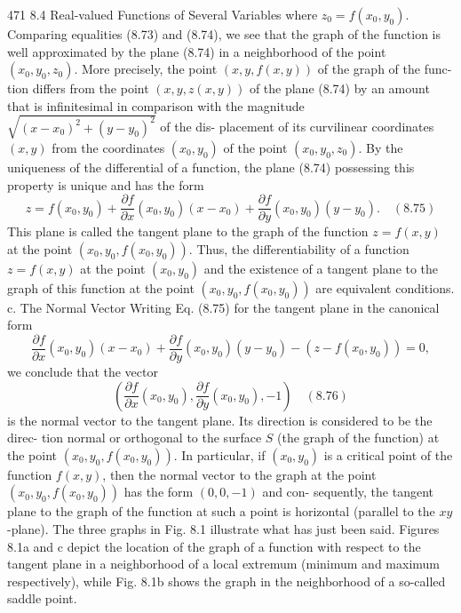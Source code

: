 471
8.4 Real-valued Functions of Several Variables
where $z_0 = f (x_0, y_0)$. Comparing equalities (8.73) and (8.74), we see that the graph
of the function is well approximated by the plane (8.74) in a neighborhood of the
point $(x_0, y_0, z_0)$. More precisely, the point $(x, y, f (x, y))$ of the graph of the func-
tion differs from the point $(x, y, z(x, y))$ of the plane (8.74) by an amount that is
infinitesimal in comparison with the magnitude $\sqrt{(x - x_0)^2 + (y - y_0)^2}$ of the dis-
placement of its curvilinear coordinates $(x, y)$ from the coordinates $(x_0, y_0)$ of the
point $(x_0, y_0, z_0)$.
By the uniqueness of the differential of a function, the plane (8.74) possessing
this property is unique and has the form
$$z = f (x_0, y_0) + \frac{\partial f}{\partial x}(x_0, y_0)(x - x_0) + \frac{\partial f}{\partial y}(x_0, y_0)(y - y_0). \quad (8.75)$$
This plane is called the tangent plane to the graph of the function $z = f (x, y)$ at the
point $(x_0, y_0, f (x_0, y_0))$.
Thus, the differentiability of a function $z = f(x, y)$ at the point $(x_0, y_0)$
and the existence of a tangent plane to the graph of this function at the point
$(x_0, y_0, f (x_0, y_0))$ are equivalent conditions.
c. The Normal Vector
Writing Eq. (8.75) for the tangent plane in the canonical form
$$\frac{\partial f}{\partial x}(x_0, y_0)(x - x_0) + \frac{\partial f}{\partial y}(x_0, y_0)(y - y_0) - (z - f (x_0, y_0)) = 0,$$
we conclude that the vector
$$\left( \frac{\partial f}{\partial x}(x_0, y_0), \frac{\partial f}{\partial y}(x_0, y_0), -1 \right) \quad (8.76)$$
is the normal vector to the tangent plane. Its direction is considered to be the direc-
tion normal or orthogonal to the surface $S$ (the graph of the function) at the point
$(x_0, y_0, f (x_0, y_0))$.
In particular, if $(x_0, y_0)$ is a critical point of the function $f (x, y)$, then the normal
vector to the graph at the point $(x_0, y_0, f (x_0, y_0))$ has the form $(0, 0, -1)$ and con-
sequently, the tangent plane to the graph of the function at such a point is horizontal
(parallel to the $xy$-plane).
The three graphs in Fig. 8.1 illustrate what has just been said.
Figures 8.1a and c depict the location of the graph of a function with respect to
the tangent plane in a neighborhood of a local extremum (minimum and maximum
respectively), while Fig. 8.1b shows the graph in the neighborhood of a so-called
saddle point.